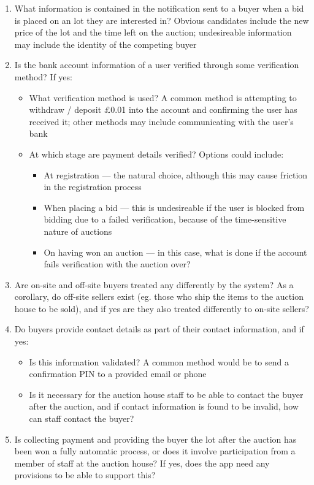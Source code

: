 \documentclass[titlepage, 12pt]{extarticle}
\begin{document}
\begin{enumerate}
\begin{itemize}
  \end{itemize}
\item What information is contained in the notification sent to a buyer when a bid is placed on an lot they are interested in? Obvious candidates include the new price of the lot and the time left on the auction; undesireable information may include the identity of the competing buyer
\item Is the bank account information of a user verified through some verification method? If yes:
  \begin{itemize}
  \item What verification method is used? A common method is attempting to withdraw / deposit \pounds 0.01 into the account and confirming the user has received it; other methods may include communicating with the user's bank
  \item At which stage are payment details verified? Options could include:
    \begin{itemize}
    \item At registration --- the natural choice, although this may cause friction in the registration process
    \item When placing a bid --- this is undesireable if the user is blocked from bidding due to a failed verification, because of the time-sensitive nature of auctions
    \item On having won an auction --- in this case, what is done if the account fails verification with the auction over?
    \end{itemize}
  \end{itemize}
\item Are on-site and off-site buyers treated any differently by the system? As a corollary, do off-site sellers exist (eg. those who ship the items to the auction house to be sold), and if yes are they also treated differently to on-site sellers?
\item Do buyers provide contact details as part of their contact information, and if yes:
  \begin{itemize}
  \item Is this information validated? A common method would be to send a confirmation PIN to a provided email or phone
  \item Is it necessary for the auction house staff to be able to contact the buyer after the auction, and if contact information is found to be invalid, how can staff contact the buyer?
  \end{itemize}
\item Is collecting payment and providing the buyer the lot after the auction has been won a fully automatic process, or does it involve participation from a member of staff at the auction house? If yes, does the app need any provisions to be able to support this?

\end{enumerate}
\end{document}
